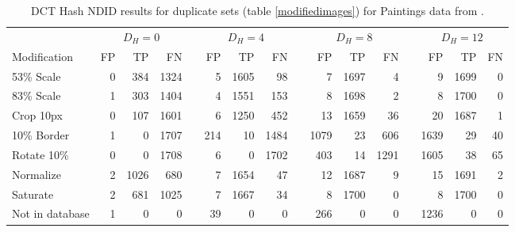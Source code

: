 \documentclass[english,12pt,a4paper,pdftex,elec,utf8]{aaltothesis}
\begin{document}
\begin{table}[htb]\footnotesize
\caption{ DCT Hash NDID results for duplicate sets (table \ref{modifiedimages}) for Paintings data from \cite{Vedaldi2012}. }
\label{dctresults}
\begin{center}
  \setlength\tabcolsep{3pt} %
  \begin{tabular}{@{}lrrrrrrrrrrrrrrr@{}}
    \toprule
    & \multicolumn{3}{c}{$D_H = 0$} &\phantom{abc} &\multicolumn{3}{c}{$D_H = 4$} &\phantom{abc} & \multicolumn{3}{c}{$D_H=8$} &\phantom{abc} & \multicolumn{3}{c}{$D_H=12$}\\
\cmidrule{2-4} \cmidrule{6-8} \cmidrule{10-12} \cmidrule{14-16}
    Modification & FP & TP & FN &\phantom{abc} & FP & TP & FN &\phantom{abc} & FP & TP & FN &\phantom{abc} & FP & TP & FN\\ \midrule
    53\% Scale   & 0 & 384 & 1324 &\phantom{abc} & 5 & 1605 & 98 &\phantom{abc} & 7 & 1697 & 4 &\phantom{abc} & 9 & 1699 & 0\\
    83\% Scale   & 1 & 303 & 1404 &\phantom{abc} & 4 & 1551 & 153 &\phantom{abc} & 8 & 1698 & 2 &\phantom{abc} & 8 & 1700 & 0\\
    Crop 10px    & 0 & 107 & 1601 &\phantom{abc} & 6 & 1250 & 452 &\phantom{abc} & 13& 1659 & 36 &\phantom{abc} & 20 & 1687 & 1\\
    10\% Border  & 1 & 0 & 1707 & \phantom{abc} & 214 & 10 & 1484 &\phantom{abc} & 1079 & 23 & 606 &\phantom{abc} & 1639 & 29 & 40\\
    Rotate 10\%  & 0 & 0 & 1708 &\phantom{abc} & 6 & 0 & 1702 &\phantom{abc} & 403 & 14 & 1291 &\phantom{abc} & 1605 & 38 & 65\\
    Normalize    & 2 & 1026 & 680 &\phantom{abc} & 7 & 1654 & 47 &\phantom{abc} & 12 & 1687 & 9 &\phantom{abc} & 15 & 1691 & 2\\
    Saturate     & 2 & 681 & 1025 &\phantom{abc} & 7 & 1667 & 34 &\phantom{abc} & 8 & 1700 & 0 &\phantom{abc} & 8 & 1700 & 0\\
    Not in database & 1 & 0 & 0 &\phantom{abc} & 39 & 0 & 0 &\phantom{abc} & 266 & 0 & 0 &\phantom{abc} & 1236 & 0 & 0\\

    \bottomrule
\end{tabular}
\end{center}
\end{table}
\end{document}
